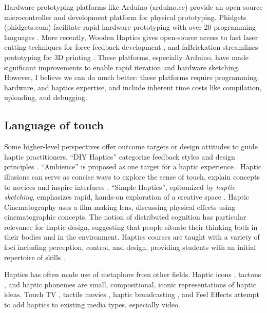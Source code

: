 Hardware prototyping platforms like
Arduino (arduino.cc) provide an open source microcontroller %
and development platform %
for physical prototyping.
Phidgets (phidgets.com) facilitate rapid hardware prototyping with over 20 programming languages 
\cite{Greenberg2001}.
More recently, Wooden Haptics gives open-source access to fast laser cutting techniques for force feedback development \cite{Forsslund2015}, and
faBrickation streamlines prototyping for 3D printing \cite{Mueller2014}. %
These platforms, especially Arduino, have made significant improvements to enable rapid iteration and hardware sketching.
However, I believe we can do much better: these platforms require programming, hardware, and haptics expertise, and include inherent time costs like compilation, uploading, and debugging.



\subsection{Language of touch }
Some higher-level perspectives offer outcome targets or design attitudes to guide haptic practitioners.
``DIY Haptics'' categorize  feedback styles and design principles \cite{Hayward2007,MacLean2008}.
``Ambience'' is proposed as one target for a haptic experience \cite{MacLean2009}.
Haptic illusions can serve as concise ways to explore the sense of touch, explain concepts to novices and inspire interfaces \cite{Hayward2008}.
``Simple Haptics'', epitomized by \emph{haptic sketching}, emphasizes rapid, hands-on exploration of a creative space \cite{Moussette2010,Moussette2011}. %
Haptic Cinematography \cite{Danieau2014} uses a film-making lens, discussing physical effects using cinematographic concepts.
The notion of distributed cognition \cite{Hutchins1995} has particular relevance for haptic design, %
suggesting that people situate their thinking both in their bodies and in the environment.
Haptics courses are taught with a variety of foci including perception, control, and design, providing students with an initial repertoire of skills \cite{Okamura2012, Jones2014}.

Haptics has often made use of metaphors from other fields.
Haptic icons  \cite{MacLean2003}, tactons \cite{Brewster2004}, and haptic phonemes \cite{Enriquez2006} are small, compositional, iconic representations of haptic ideas.
Touch TV \cite{Modhrain2001},  tactile movies \cite{Kim2009}, haptic broadcasting \cite{Cha2009}, and Feel Effects \cite{Israr2014} attempt to add haptics to existing media types, especially video.


